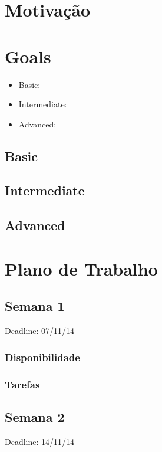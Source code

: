 \documentclass[a4paper]{article}
\begin{document}


\tableofcontents
\pagebreak

\section{Motivação}

\pagebreak

\section{Goals}

\begin{itemize}
\item Basic:
\item Intermediate:
\item Advanced:
\end{itemize}

\subsection{Basic}

\subsection{Intermediate}

\subsection{Advanced}

\pagebreak

\section{Plano de Trabalho}

\subsection{Semana 1}
Deadline: 07/11/14
\subsubsection{Disponibilidade}
\subsubsection{Tarefas}

\subsection{Semana 2}
Deadline: 14/11/14
\end{document}
